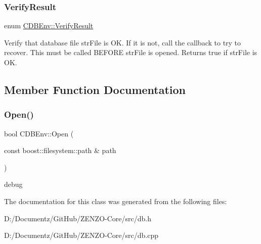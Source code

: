 \subsubsection{\texorpdfstring{VerifyResult}{VerifyResult}}
{\footnotesize\ttfamily enum \mbox{\hyperlink{class_c_d_b_env_a6fbf26da5d7f8f64a77a3ba15e4df244}{C\+D\+B\+Env\+::\+Verify\+Result}}}

Verify that database file str\+File is OK. If it is not, call the callback to try to recover. This must be called B\+E\+F\+O\+RE str\+File is opened. Returns true if str\+File is OK. 

\subsection{Member Function Documentation}
\mbox{\label{class_c_d_b_env_aaaef61cd032e25144c06e405fb7f93cf}} 
\subsubsection{\texorpdfstring{Open()}{Open()}}
{\footnotesize\ttfamily bool C\+D\+B\+Env\+::\+Open (\begin{DoxyParamCaption}\item[{const boost\+::filesystem\+::path \&}]{path }\end{DoxyParamCaption})}

debug 

The documentation for this class was generated from the following files\+:\begin{DoxyCompactItemize}
\item 
D\+:/\+Documentz/\+Git\+Hub/\+Z\+E\+N\+Z\+O-\/\+Core/src/db.\+h\item 
D\+:/\+Documentz/\+Git\+Hub/\+Z\+E\+N\+Z\+O-\/\+Core/src/db.\+cpp\end{DoxyCompactItemize}
